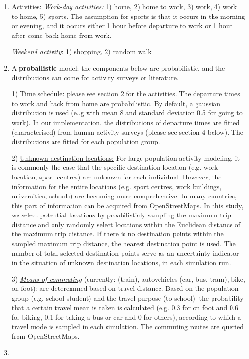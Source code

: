 \documentclass[]{article}
\begin{document}
\begin{enumerate}
\def\labelenumi{\arabic{enumi}.}
\item
  Activities:
  \emph{Work-day activities:} 1) home, 2) home to work, 3) work, 4) work
  to home, 5) sports. The assumption for sports is that it occurs in the
  morning or evening, and it occurs either 1 hour before departure to
  work or 1 hour after come back home from work.

  \emph{Weekend activity}: 1) shopping, 2) random walk 
\item
  A \textbf{probailistic} model: the components below are probabilistic,
  and the distributions can come for activity surveys or literature.

  1) \underline{Time schedule:} please see section 2 for the activities.
  The departure times to work and back from home are probabilisitic. By
  default, a gaussian distribution is used (e..g with mean 8 and
  standard deviation 0.5 for going to work). In our implementation, the
  distributions of departure times are fitted (characterised) from human
  activity surveys (please see section 4 below). The distributions are
  fitted for each population group.

  2) \underline{Unknown destination locations:} For large-population
  activity modeling, it is commonly the case that the specific
  destination location (e.g. work location, sport centres) are unknown
  for each individual. However, the information for the entire locations
  (e.g. sport centres, work buildings, universities, schools) are
  becoming more comprehensive. In many countries, this part of
  information can be acquired from OpenStreetMaps. In this study, we
  select potential locations by proabilisticly sampling the maximum trip
  distance and only randomly select locations within the Euclidean
  distance of the maximum trip distance. If there is no destination
  points within the sampled maximum trip distance, the nearest
  destination point is used. The number of total selected destination
  points serve as an uncertainty indicator in the situation of unknown
  destination locations, in each simulation run.

  3) \emph{\underline{Means of commuting}} (currently: (train),
  autovehicles (car, bus, tram), bike, on foot): are deteremined based
  on travel distance. Based on the population group (e.g. school
  student) and the travel purpose (to school), the probability that a
  certain travel mean is taken is calculated (e.g. 0.3 for on foot and
  0.6 for biking, 0.1 for taking a bus or car and 0 for others),
  according to which a travel mode is sampled in each simulation. The
  commuting routes are queried from OpenStreetMaps.
\item



\end{enumerate}
\end{document}
